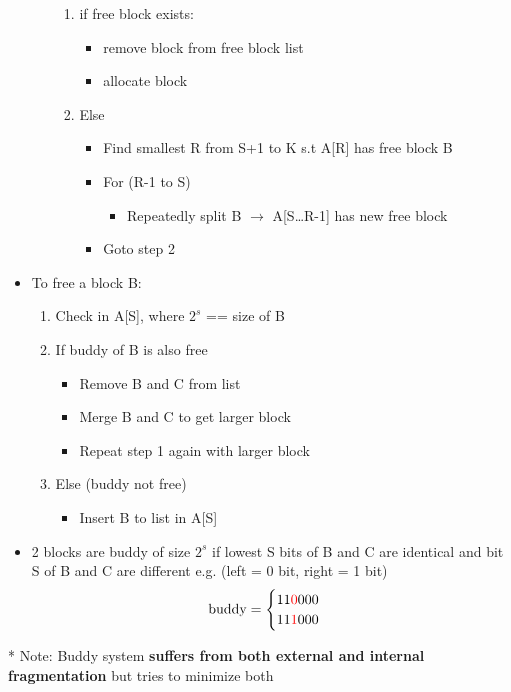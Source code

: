\documentclass[13pt,landscape,a4paper]{article}
\newcommand\red[1]{\textcolor{red}{#1}}
\begin{document}
\begin{multicols*}{3}
\begin{itemize}
\begin{enumerate}
                \begin{enumerate}
                    \item if free block exists:
                    \begin{itemize}
                        \item remove block from free block list
                        \item allocate block
                    \end{itemize}
                    \item Else
                    \begin{itemize}
                        \item Find smallest R from S+1 to K s.t A[R] has free block B
                        \item For (R-1 to S)
                        \begin{itemize}
                            \item Repeatedly split B $\rightarrow$ A[S…R-1] has new free block
                        \end{itemize}
                        \item Goto step 2
                    \end{itemize}
                \end{enumerate}
            \end{enumerate}
            \item To free a block B:
            \begin{enumerate}
                \item Check in A[S], where $2^s$ == size of B
                \item If buddy of B is also free
                \begin{itemize}
                    \item Remove B and C from list
                    \item Merge B and C to get larger block
                    \item Repeat step 1 again with larger block
                \end{itemize}
                \item Else (buddy not free)
                \begin{itemize}
                    \item Insert B to list in A[S]
                \end{itemize}
            \end{enumerate}
            \item 2 blocks are buddy of size $2^s$ if lowest S bits of B and C are identical and bit S of B and C are different e.g. (left = 0 bit, right = 1 bit)
            \[\text{buddy} = \begin{cases}
                11\red{0}000 \\
                11\red{1}000
            \end{cases}\]
        \end{itemize}
        * Note: Buddy system \textbf{suffers from both external and internal fragmentation} but tries to minimize both
        \columnbreak

\end{multicols*}
\end{document}
